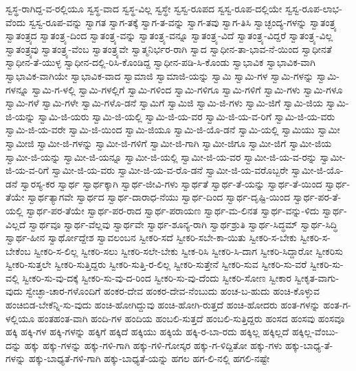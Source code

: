 ಸ್ವಸ್ಥ-ರಾಗಿದ್ದ-ವ-ರಲ್ಲಿಯೂ
ಸ್ವಸ್ಥ-ವಾದ
ಸ್ವಸ್ಥ-ವಿಲ್ಲ
ಸ್ವಸ್ಥೇ
ಸ್ವಸ್ವ-ರೂಪದ
ಸ್ವಸ್ವ-ರೂಪ-ದಲ್ಲಿಯೇ
ಸ್ವಸ್ವ-ರೂಪ-ಲಾಭ-ವೆಂದು
ಸ್ವಸ್ವ-ರೂಪ-ವನ್ನು
ಸ್ವಾಗತ
ಸ್ವಾಗ-ತಕ್ಕೆ
ಸ್ವಾಗ-ತ-ವನ್ನು
ಸ್ವಾಗ-ತವು
ಸ್ವಾಗ-ತಿಸಿ
ಸ್ವಾಚ್ಛಂದ್ಯ-ಗಳನ್ನು
ಸ್ವಾತಂತ್ರ್ಯ
ಸ್ವಾತಂತ್ರ್ಯದ
ಸ್ವಾತಂತ್ರ್ಯ-ದಿಂದ
ಸ್ವಾತಂತ್ರ್ಯ-ವನ್ನು
ಸ್ವಾತಂತ್ರ್ಯ-ವನ್ನೂ
ಸ್ವಾತಂತ್ರ್ಯ-ವಿದೆ
ಸ್ವಾತಂತ್ರ್ಯ-ವಿದ್ದರೆ
ಸ್ವಾತಂತ್ರ್ಯ-ವಿಲ್ಲ
ಸ್ವಾತಂತ್ರ್ಯವು
ಸ್ವಾತಂತ್ರ್ಯ-ವೆಂಬ
ಸ್ವಾತಂತ್ರ್ಯವೇ
ಸ್ವಾತ್ಮನಿರ್ಭರ-ರಾಗಿ
ಸ್ವಾದ
ಸ್ವಾಧೀನ-ತಾ-ಭಾವ-ನೆ-ಯಿಂದ
ಸ್ವಾಧೀನತೆ
ಸ್ವಾಧೀನ-ತೆ-ಯುಳ್ಳ
ಸ್ವಾಧೀನ-ದಲ್ಲಿ-ರಿಸಿ-ಕೊಂಡಿದ್ದ
ಸ್ವಾಧೀನ-ಪಡಿ-ಸಿ-ಕೊಂಡು
ಸ್ವಾಭಾವಿಕ
ಸ್ವಾಭಾವಿಕ-ವಾಗಿ
ಸ್ವಾಭಾವಿಕ-ವಾಗಿಯೇ
ಸ್ವಾಭಾವಿಕ-ವಾದ
ಸ್ವಾಮಾಜಿ
ಸ್ವಾಮಾಜಿ-ಯನ್ನು
ಸ್ವಾಮಿ
ಸ್ವಾಮಿ-ಗಳ
ಸ್ವಾಮಿ-ಗಳನ್ನು
ಸ್ವಾಮಿ-ಗಳನ್ನೂ
ಸ್ವಾಮಿ-ಗ-ಳಲ್ಲಿ
ಸ್ವಾಮಿ-ಗಳಲ್ಲಿಗೆ
ಸ್ವಾಮಿ-ಗಳಿಂದ
ಸ್ವಾಮಿ-ಗಳಿಗೂ
ಸ್ವಾಮಿ-ಗಳಿಗೆ
ಸ್ವಾಮಿ-ಗಳು
ಸ್ವಾಮಿ-ಗಳೂ
ಸ್ವಾಮಿ-ಗಳೆ
ಸ್ವಾಮಿ-ಗಳೇ
ಸ್ವಾಮಿ-ಗಳೊ-ಡನೆ
ಸ್ವಾಮಿಗೆ
ಸ್ವಾಮಿಜಿ
ಸ್ವಾಮಿ-ಜಿ-ಗಳು
ಸ್ವಾಮಿ-ಜಿಗೆ
ಸ್ವಾಮಿ-ಜಿಯ
ಸ್ವಾಮಿ-ಜಿ-ಯನ್ನು
ಸ್ವಾಮಿ-ಜಿ-ಯರು
ಸ್ವಾಮಿ-ಜಿ-ಯಲ್ಲಿ
ಸ್ವಾಮಿ-ಜಿ-ಯ-ವರ
ಸ್ವಾಮಿ-ಜಿ-ಯ-ವ-ರಿಗೆ
ಸ್ವಾಮಿ-ಜಿ-ಯ-ವರು
ಸ್ವಾಮಿ-ಜಿ-ಯ-ವರೇ
ಸ್ವಾಮಿ-ಜಿ-ಯಿಂದ
ಸ್ವಾಮಿ-ಜಿಯೂ
ಸ್ವಾಮಿ-ಜಿ-ಯೊ-ಡನೆ
ಸ್ವಾಮಿ-ಯಲ್ಲಿ
ಸ್ವಾಮಿಯು
ಸ್ವಾಮೀ
ಸ್ವಾಮೀಜಿ
ಸ್ವಾಮೀ-ಜಿ-ಗಳನ್ನು
ಸ್ವಾಮೀ-ಜಿ-ಗಳಿಗೆ
ಸ್ವಾಮೀ-ಜಿ-ಗಾಗಿ
ಸ್ವಾಮೀ-ಜಿಗೂ
ಸ್ವಾಮೀ-ಜಿಗೆ
ಸ್ವಾಮೀ-ಜಿಯ
ಸ್ವಾಮೀ-ಜಿ-ಯನ್ನು
ಸ್ವಾಮೀ-ಜಿ-ಯನ್ನೂ
ಸ್ವಾಮೀ-ಜಿ-ಯಲ್ಲಿ
ಸ್ವಾಮೀ-ಜಿ-ಯ-ವರ
ಸ್ವಾಮೀ-ಜಿ-ಯ-ವ-ರನ್ನು
ಸ್ವಾಮೀ-ಜಿ-ಯ-ವ-ರಿಗೆ
ಸ್ವಾಮೀ-ಜಿ-ಯ-ವರು
ಸ್ವಾಮೀ-ಜಿ-ಯ-ವ-ರೊ-ಡನೆ
ಸ್ವಾಮೀ-ಜಿ-ಯ-ವರೊಬ್ಬರೇ
ಸ್ವಾಮೀ-ಜಿ-ಯೊ-ಡನೆ
ಸ್ವಾರಸ್ಯ-ಕರ
ಸ್ವಾರ್ಥ
ಸ್ವಾರ್ಥಕ್ಕಾಗಿ
ಸ್ವಾರ್ಥ-ಜೀವಿ-ಗಳು
ಸ್ವಾರ್ಥತೆ
ಸ್ವಾರ್ಥ-ತೆ-ಯನ್ನು
ಸ್ವಾರ್ಥ-ತೆ-ಯಿಂದ
ಸ್ವಾರ್ಥ-ತೆಯೇ
ಸ್ವಾರ್ಥತ್ಯಾಗವೇ
ಸ್ವಾರ್ಥದ
ಸ್ವಾರ್ಥ-ದಾರಾಧ-ನೆಯು
ಸ್ವಾರ್ಥ-ದಿಂದ
ಸ್ವಾರ್ಥ-ದೃಷ್ಟಿ-ಯಿಂದ
ಸ್ವಾರ್ಥ-ಪರ-ತೆ-ಯಲ್ಲಿ
ಸ್ವಾರ್ಥ-ಪರ-ತೆಯೇ
ಸ್ವಾರ್ಥ-ಪರ-ರಾದ
ಸ್ವಾರ್ಥ-ಪರಾಯಣ
ಸ್ವಾರ್ಥ-ಮ-ಲಿನತ
ಸ್ವಾರ್ಥ-ವನ್ನು-ಳಿದು
ಸ್ವಾರ್ಥ-ವಿಲ್ಲದೆ
ಸ್ವಾರ್ಥವೂ
ಸ್ವಾರ್ಥ-ವೆಲ್ಲವು
ಸ್ವಾರ್ಥವೇ
ಸ್ವಾರ್ಥ-ಶೂನ್ಯ-ರಾಗಿ
ಸ್ವಾರ್ಥಶ್ರುತಿ
ಸ್ವಾರ್ಥ-ಸಿದ್ಧಮ್
ಸ್ವಾರ್ಥ-ಸಿದ್ಧಿ
ಸ್ವಾರ್ಥ-ಹೀನ
ಸ್ವಾರ್ಥೋದ್ದೇಶ
ಸ್ವಾವಲಂಬನ
ಸ್ವೀಕರಿ-ಸದೆ
ಸ್ವೀಕರಿ-ಸಬೇ-ಕಾ-ಯಿತು
ಸ್ವೀಕರಿ-ಸ-ಬೇಕು
ಸ್ವೀಕರಿ-ಸ-ಬೇಕೆಂಬ
ಸ್ವೀಕರಿ-ಸ-ಲಿಲ್ಲ
ಸ್ವೀಕರಿ-ಸಲು
ಸ್ವೀಕರಿ-ಸಲೇ-ಬೇಕು
ಸ್ವೀಕ-ರಿಸಿ
ಸ್ವೀಕರಿ-ಸಿ-ದಾಗ
ಸ್ವೀಕರಿ-ಸಿದ್ದಾರೋ
ಸ್ವೀಕರಿಸು
ಸ್ವೀಕರಿ-ಸುತ್ತಲೇ
ಸ್ವೀಕರಿ-ಸುತ್ತಿದ್ದರು
ಸ್ವೀಕರಿ-ಸುತ್ತಿ-ರ-ಲಿಲ್ಲ
ಸ್ವೀಕರಿ-ಸುತ್ತೇನೆ
ಸ್ವೀಕರಿ-ಸುವ
ಸ್ವೀಕರಿ-ಸು-ವರೆ
ಸ್ವೀಕರಿ-ಸು-ವಲ್ಲಿ
ಸ್ವೀಕರಿ-ಸು-ವು-ದಕ್ಕೆ
ಸ್ವೀಕರಿ-ಸು-ವು-ದ-ರಿಂದ
ಸ್ವೀಕರಿ-ಸು-ವು-ದೆಂದು
ಸ್ವೀಕರಿ-ಸೋಣ
ಸ್ವೀಕಾರ
ಸ್ವೀಕೃತ-ವಾಗು-ವುದು
ಸ್ವೇಚ್ಛಾ-ಚಾರ-ಗಳೊಂದಿಗೆ
ಹಂಕರ-ದೇವ
ಹಂಕರ-ದೇವ-ನೆಂಬುದು
ಹಂಚ-ಬ-ಹುದು
ಹಂಚಿ-ಕೊಳ್ಳುವ
ಹಂಚಿಬಿಡ-ಬೇಕೆನ್ನಿ-ಸು-ವುದು
ಹಂಚಿ-ಹೋಗಿದ್ದುವು
ಹಂಚಿ-ಹೋಗಿ-ರುತ್ತದೆ
ಹಂಚಿ-ಹೋದರು
ಹಂತ-ಗಳನ್ನು
ಹಂತ-ಗ-ಳಲ್ಲಿಯೂ
ಹಂತಹಂತ-ವಾಗಿ
ಹಂದಿ-ಗಳ
ಹಂದಿಯ
ಹಂಬಲಿ-ಸುತ್ತದೆ
ಹಂಬಲಿ-ಸುತ್ತಿದ್ದರು
ಹಂಸದ
ಹಂಸವು
ಹಂಸವೂ
ಹಕ್ಕಿ
ಹಕ್ಕಿ-ಗಳ
ಹಕ್ಕಿ-ಗಳನ್ನು
ಹಕ್ಕಿಗೆ
ಹಕ್ಕಿದೆ
ಹಕ್ಕಿಯು
ಹಕ್ಕಿಯೆ
ಹಕ್ಕಿ-ರ-ಬಾ-ರದು
ಹಕ್ಕಿಲ್ಲ
ಹಕ್ಕಿಲ್ಲದೆ
ಹಕ್ಕಿಲ್ಲ-ವೆಂಬು-ದನ್ನು
ಹಕ್ಕು
ಹಕ್ಕು-ಗಳನ್ನು
ಹಕ್ಕು-ಗಳಿ-ಗಾಗಿ
ಹಕ್ಕು-ಗಳಿ-ಗೋಸ್ಕರ
ಹಕ್ಕು-ಗ-ಳಿದ್ದಿತೋ
ಹಕ್ಕು-ಗಳು
ಹಕ್ಕು-ಬಾಧ್ಯ-ತೆ-ಗಳನ್ನು
ಹಕ್ಕು-ಬಾಧ್ಯತೆ-ಗಳಿ-ಗಾಗಿ
ಹಕ್ಕು-ಬಾಧ್ಯತೆ-ಯನ್ನು
ಹಗಲ
ಹಗ-ಲಿ-ನಲ್ಲಿ
ಹಗಲಿ-ನಷ್ಟೇ
